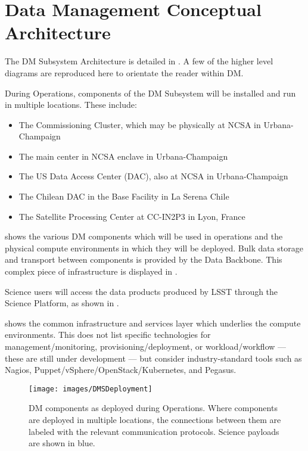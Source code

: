 \section{Data Management Conceptual Architecture \label{sect:dmarc}}

The DM Subsystem Architecture is detailed in .
A few of the higher level diagrams are reproduced here to orientate the reader within DM.

During Operations, components of the DM Subsystem will be installed and run in
multiple locations. These include:

\begin{itemize}
\item The Commissioning Cluster, which may be physically at NCSA in Urbana-Champaign
\item The main center in NCSA enclave in Urbana-Champaign
\item The US Data Access Center (DAC), also at NCSA in Urbana-Champaign
\item The Chilean DAC in the Base Facility in La Serena Chile
\item The Satellite Processing Center at CC-IN2P3 in Lyon, France
\end{itemize}

 shows the various DM components which will be used in operations and the physical compute environments in which they will be deployed.
Bulk data storage and transport between components is provided by the Data Backbone. This complex piece of infrastructure is displayed in .

Science users will access the data products produced by LSST through the
Science Platform, as shown in .

 shows the common infrastructure and services layer which underlies the compute environments.
This does not list specific technologies for management/monitoring, provisioning/deployment, or workload/workflow --- these are still under development --- but consider industry-standard tools such as Nagios, Puppet/vSphere/OpenStack/Kubernetes, and Pegasus.

\begin{figure}[htbp]
\begin{center}
\texttt{[image: images/DMSDeployment]}
\caption{DM components as deployed during Operations. Where components are
deployed in multiple locations, the connections between them are labeled with
the relevant communication protocols. Science payloads are shown in blue.
\label{fig:dmsdeploy}}
\end{center}
\end{figure}

